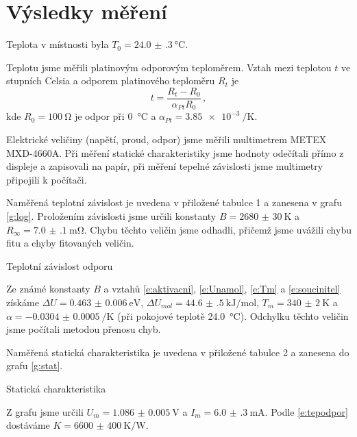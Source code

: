 \section*{Výsledky měření}
Teplota v místnosti byla $T_0 = \SI{24.0(3)}{\degreeCelsius}$.

Teplotu jsme měřili platinovým odporovým teploměrem.
Vztah mezi teplotou $t$ ve stupních Celsia a odporem platinového teploměru $R_t$ je
\begin{equation}
t=\frac{R_t - R_0}{\alpha_{Pt} R_0} \,,
\end{equation}
kde $R_0 = \SI{100}{\ohm}$ je odpor při \SI{0}{\degreeCelsius} a $\alpha_{Pt} = \SI{3.85e-3}{\per\kelvin}$.

Elektrické veličiny (napětí, proud, odpor) jsme měřili multimetrem METEX MXD-4660A.
Při měření statické charakteristiky jsme hodnoty odečítali přímo z displeje a zapisovali na papír, při měření tepelné závislosti jsme multimetry připojili k počítači.



Naměřená teplotní závislost je uvedena v přiložené tabulce 1 a zanesena v grafu \ref{g:log}.
Proložením závislosti jsme určili konstanty $B =\SI{2680(30)}{\kelvin}$ a $R_\infty = \SI{7.0(1)}{\milli\ohm}$.
Chybu těchto veličin jsme odhadli, přičemž jsme uvážili chybu fitu a chyby fitovaných veličin.

\begin{graph}[htbp] 
\centering

\caption{Teplotní závislost odporu}
\label{g:log}
\end{graph}

Ze známé konstanty $B$ a vztahů \eqref{e:aktivacni}, \eqref{e:Unamol}, \eqref{e:Tm} a \eqref{e:soucinitel} získáme
$\Delta U= \SI{0.463(6)}{\electronvolt}$,
$\Delta U_{mol}=\SI{44.6(5)}{\kilo\joule\per\mole}$,
$T_m=\SI{340(2)}{\kelvin}$ a
$\alpha=\SI{-0.0304(5)}{\per\kelvin}$
(při pokojové teplotě \SI{24.0}{\degreeCelsius}).
Odchylku těchto veličin jsme počítali metodou přenosu chyb.\cite{prakt}


Naměřená statická charakteristika je uvedena v přiložené tabulce 2
a zanesena do grafu \ref{g:stat}.

\begin{graph}[htbp] 
\centering

\caption{Statická charakteristika}
\label{g:stat}
\end{graph}

Z grafu jsme určili $U_m = \SI{1.086(5)}{\volt}$ a $I_m=\SI{6.0(3)}{\milli\ampere}$.
Podle \eqref{e:tepodpor} dostáváme $K=\SI{6600(400)}{\kelvin\per\watt}$.